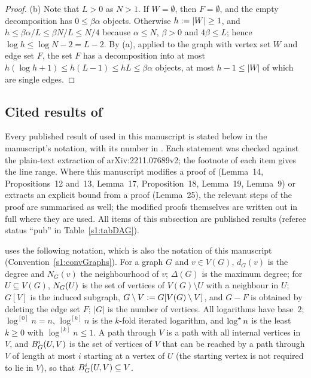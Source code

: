 \begin{proof}
(b) Note that $L>0$ as $N>1$. If $W=\emptyset$, then $F=\emptyset$, and the
empty decomposition has $0\le\beta\alpha$ objects. Otherwise $h\mathrel{:=}|W|\ge1$,
and $h\le\beta\alpha/L\le\beta N/L\le N/4$ because $\alpha\le N$, $\beta>0$ and
$4\beta\le L$; hence $\log h\le\log N-2=L-2$. By (a), applied to the graph with
vertex set $W$ and edge set $F$, the set $F$ has a decomposition into at most
$h(\log h+1)\le h(L-1)\le hL\le\beta\alpha$ objects, at most $h-1\le|W|$ of
which are single edges.
\end{proof}

\subsection{Cited results of \BMnames{}}\label{s1:ssecCited}

Every published result of \cite{BM} used in this manuscript is stated below in the
manuscript's notation, with its number in \cite{BM}. Each statement was checked
against the plain-text extraction of arXiv:2211.07689v2; the footnote of each
item gives the line range. Where this manuscript modifies a proof of \cite{BM}
(Lemma~14, Propositions~12 and~13, Lemma~17, Proposition~18, Lemma~19, Lemma~9)
or extracts an explicit bound from a proof (Lemma~25), the relevant steps of the
proof are summarised as well; the modified proofs themselves are written out in
full where they are used. All items of this subsection are published results
(referee status ``pub'' in Table~\ref{s1:tabDAG}).

\begin{citedresult}\label{s1:citNotation}
\cite{BM} uses the following notation, which is also the notation of this
manuscript (Convention~\ref{s1:convGraphs}). For a graph $G$ and $v\in V(G)$,
$d_G(v)$ is the degree and $N_G(v)$ the neighbourhood of $v$; $\Delta(G)$ is the
maximum degree; for $U\subseteq V(G)$, $N_G(U)$ is the set of vertices of
$V(G)\setminus U$ with a neighbour in $U$; $G[V]$ is the induced subgraph,
$G\setminus V\mathrel{:=} G[V(G)\setminus V]$, and $G-F$ is obtained by deleting the
edge set $F$; $|G|$ is the number of vertices. All logarithms have base~$2$;
$\log^{[0]}n=n$, $\log^{[k]}n$ is the $k$-fold iterated logarithm, and $\log^{\star} n$
is the least $k\ge0$ with $\log^{[k]}n\le1$. A path through $V$ is a path with
all internal vertices in $V$, and $B^{i}_{G}(U,V)$ is the set of vertices of
$V$ that can be reached by a path through $V$ of length at most $i$ starting at a
vertex of $U$ (the starting vertex is not required to lie in $V$), so that
$B^{i}_{G}(U,V)\subseteq V$.
\end{citedresult}

